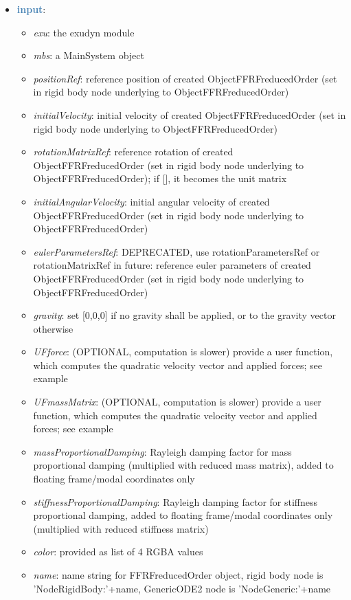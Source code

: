 \begin{itemize}[leftmargin=1.4cm]
\begin{itemize}[leftmargin=1.4cm]
\begin{itemize}[leftmargin=1.4cm]
\begin{itemize}[leftmargin=0.5cm]
\begin{itemize}[leftmargin=1.4cm]
\begin{itemize}[leftmargin=1.4cm]
\begin{itemize}[leftmargin=1.4cm]
\begin{itemize}[leftmargin=0.5cm]
\begin{itemize}[leftmargin=0.7cm]
\item[--]\textcolor{steelblue}{\bf input}: \vspace{-6pt}
\begin{itemize}[leftmargin=1.2cm]
\setlength{\itemindent}{-0.7cm}
\item[]{\it exu}: the exudyn module
\item[]{\it mbs}: a MainSystem object
\item[]{\it positionRef}: reference position of created ObjectFFRFreducedOrder (set in rigid body node underlying to ObjectFFRFreducedOrder)
\item[]{\it initialVelocity}: initial velocity of created ObjectFFRFreducedOrder (set in rigid body node underlying to ObjectFFRFreducedOrder)
\item[]{\it rotationMatrixRef}: reference rotation of created ObjectFFRFreducedOrder (set in rigid body node underlying to ObjectFFRFreducedOrder); if [], it becomes the unit matrix
\item[]{\it initialAngularVelocity}: initial angular velocity of created ObjectFFRFreducedOrder (set in rigid body node underlying to ObjectFFRFreducedOrder)
\item[]{\it eulerParametersRef}: DEPRECATED, use rotationParametersRef or rotationMatrixRef in future: reference euler parameters of created ObjectFFRFreducedOrder (set in rigid body node underlying to ObjectFFRFreducedOrder)
\item[]{\it gravity}: set [0,0,0] if no gravity shall be applied, or to the gravity vector otherwise
\item[]{\it UFforce}: (OPTIONAL, computation is slower) provide a user function, which computes the quadratic velocity vector and applied forces; see example
\item[]{\it UFmassMatrix}: (OPTIONAL, computation is slower) provide a user function, which computes the quadratic velocity vector and applied forces; see example
\item[]{\it massProportionalDamping}: Rayleigh damping factor for mass proportional damping (multiplied with reduced mass matrix), added to floating frame/modal coordinates only
\item[]{\it stiffnessProportionalDamping}: Rayleigh damping factor for stiffness proportional damping, added to floating frame/modal coordinates only (multiplied with reduced stiffness matrix)
\item[]{\it color}: provided as list of 4 RGBA values
\item[]{\it name}: name string for FFRFreducedOrder object, rigid body node is 'NodeRigidBody:'+name, GenericODE2 node is 'NodeGeneric:'+name

\end{itemize}
\end{itemize}
\end{itemize}
\end{itemize}
\end{itemize}
\end{itemize}
\end{itemize}
\end{itemize}
\end{itemize}
\end{itemize}
